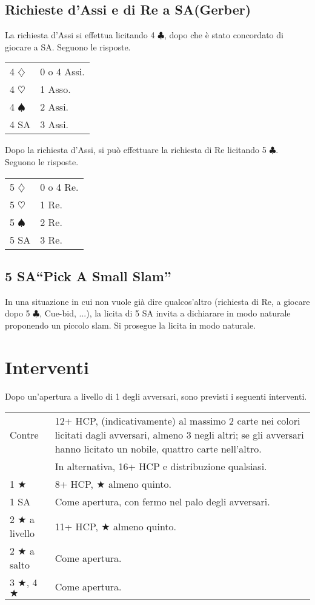 \documentclass[a4paper,10pt]{article}
\renewcommand{\c}{$\clubsuit$\xspace}
\renewcommand{\d}{$\diamondsuit$\xspace}
\newcommand{\h}{$\heartsuit$\xspace}
\newcommand{\s}{$\spadesuit$\xspace}
\renewcommand{\j}{$\bigstar$\xspace}
\newcommand{\sa}{SA\xspace}
\newcommand{\smallspace}{\vskip0.3cm}
\newenvironment{twocol}
  {\smallspace\noindent\begin{tabular}{l p{0.78\textwidth}}}
  {\end{tabular}\smallspace}
\begin{document}
\subsection{Richieste d'Assi e di Re a \sa (Gerber)}

La richiesta d'Assi si effettua licitando 4 \c, dopo che è stato concordato di giocare a \sa. Seguono le risposte.
\begin{twocol}
  4 \d & 0 o 4 Assi.\\
  4 \h & 1 Asso.\\
  4 \s & 2 Assi.\\
  4 \sa & 3 Assi.
\end{twocol}

\noindent Dopo la richiesta d'Assi, si può effettuare la richiesta di Re licitando 5 \c. Seguono le risposte.
\begin{twocol}
  5 \d & 0 o 4 Re.\\
  5 \h & 1 Re.\\
  5 \s & 2 Re.\\
  5 \sa & 3 Re.
\end{twocol}


\subsection{5 \sa ``Pick A Small Slam''}

In una situazione in cui non vuole già dire qualcos'altro (richiesta di Re, a giocare dopo 5 \c, Cue-bid, ...), la licita di 5 \sa invita a dichiarare in modo naturale proponendo un piccolo slam. Si prosegue la licita in modo naturale.



\pagebreak
\section{Interventi}

Dopo un'apertura a livello di 1 degli avversari, sono previsti i seguenti interventi.

\begin{twocol}
  Contre & 12+ HCP, (indicativamente) al massimo 2 carte nei colori licitati dagli avversari, almeno 3 negli altri; se gli avversari hanno licitato un nobile, quattro carte nell'altro. \\
  & In alternativa, 16+ HCP e distribuzione qualsiasi.\\
  1 \j & 8+ HCP, \j almeno quinto.\\
  1 \sa & Come apertura, con fermo nel palo degli avversari.\\
  2 \j a livello & 11+ HCP, \j almeno quinto.\\
  2 \j a salto & Come apertura.\\
  3 \j, 4 \j & Come apertura.
\end{twocol}
\end{document}
